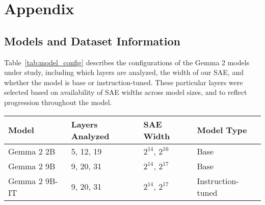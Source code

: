 \section{Appendix}





\subsection{Models and Dataset Information}
\label{app:model_info}

Table~\ref{tab:model_config} describes the configurations of the Gemma 2 models under study, including which layers are analyzed, the width of our SAE, and whether the model is base or instruction-tuned. 
These particular layers were selected based on availability of SAE widths across model sizes, and to reflect progression throughout the model.

\begin{table*}[ht]
    \centering
    \caption{Model Configurations and SAE Specifications. We analyze select intermediate layers (see \emph{Layers Analyzed}) to extract representations for the Stacked Autoencoder, whose width is indicated.}
    \label{tab:model_config}
    \begin{tabular}{llll}
        \toprule
        \textbf{Model} & \textbf{Layers Analyzed} & \textbf{SAE Width} & \textbf{Model Type} \\
        \midrule
        Gemma 2 2B & 5, 12, 19 & $2^{14}$, $2^{16}$ & Base \\
        Gemma 2 9B & 9, 20, 31 & $2^{14}$, $2^{17}$ & Base \\
        Gemma 2 9B-IT & 9, 20, 31 & $2^{14}$, $2^{17}$ & Instruction-tuned \\
        \bottomrule
    \end{tabular}
\end{table*}

